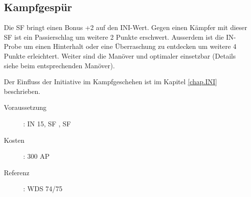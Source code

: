\subsection{Kampfgespür}
\label{sf.kampfgespuehr}
Die SF  bringt einen Bonus +2 auf den INI-Wert.
Gegen einen Kämpfer mit dieser SF ist ein Passierschlag um weitere 2 Punkte erschwert.
Ausserdem ist die IN-Probe um einen Hinterhalt oder eine Überraschung zu entdecken um weitere 4 Punkte erleichtert.
Weiter sind die Manöver  und  optimaler einsetzbar (Details siehe beim entsprechenden Manöver).

Der Einfluss der Initiative im Kampfgeschehen ist im Kapitel \ref{chap.INI} beschrieben.
\begin{description}
    \item[Voraussetzung]:
        IN 15, SF , SF 
    \item [Kosten]:
        300 AP
    \item [Referenz]:
        WDS 74/75
\end{description}
